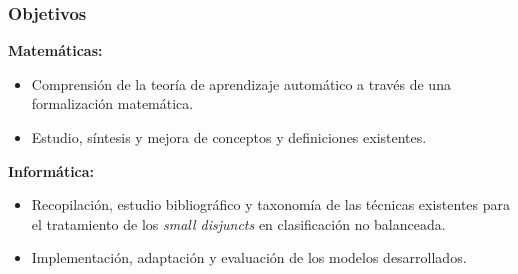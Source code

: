 \begin{frame}\frametitle{Objetivos}
 \vspace{2em}
  \par\textbf{Matemáticas:}
  \begin{itemize}
  \item Comprensión de la teoría de aprendizaje automático a través de una formalización matemática.
  \item Estudio, síntesis y mejora de conceptos y definiciones existentes.
  \end{itemize}
  \par\textbf{Informática:}
  \begin{itemize}
  \item Recopilación, estudio bibliográfico y taxonomía de las técnicas existentes para el tratamiento de los 
  \textit{small disjuncts} en clasificación no balanceada.
  \item Implementación, adaptación y evaluación de los modelos desarrollados.
 \end{itemize}
 \end{frame}